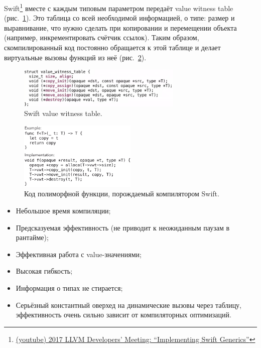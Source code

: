 Swift\footnote{\href{https://youtu.be/ctS8FzqcRug?si=y_ZYnuUOulA33d_X}{(youtube) 2017 LLVM Developers’ Meeting: ``Implementing Swift Generics''}} вместе с каждым типовым параметром передаёт value witness table (рис.~\ref{fig:swift-witness-table}).
Это таблица со всей необходимой информацией, о типе: размер и выравнивание, что нужно сделать при копировании и перемещении объекта (например, инкрементировать счётчик ссылок).
Таким образом, скомпилированный код постоянно обращается к этой таблице и делает виртуальные вызовы функций из неё (рис.~\ref{fig:swift-generated-code}).
\begin{figure}
    \centering
    \includegraphics[width=0.7\textwidth]{figs/swift-witness-table}
    \caption{Swift value witness table.}
    \label{fig:swift-witness-table}
\end{figure}
\begin{figure}
    \centering
    \includegraphics[width=0.5\textwidth]{figs/swift-generated-code}
    \caption{Код полиморфной функции, порождаемый компилятором Swift.}
    \label{fig:swift-generated-code}
\end{figure}

\begin{itemize}
    \item[\positive] Небольшое время компиляции;
    \item[\positive] Предсказуемая эффективность (не приводит к неожиданным паузам в рантайме);
    \item[\positive] Эффективная работа с value-значениями;
    \item[\positive] Высокая гибкость;
    \item[\positive] Информация о типах не стирается;
    \item[\negative] Серьёзный константный оверхед на динамические вызовы через таблицу, эффективность очень сильно зависит от компиляторных оптимизаций.
\end{itemize}

